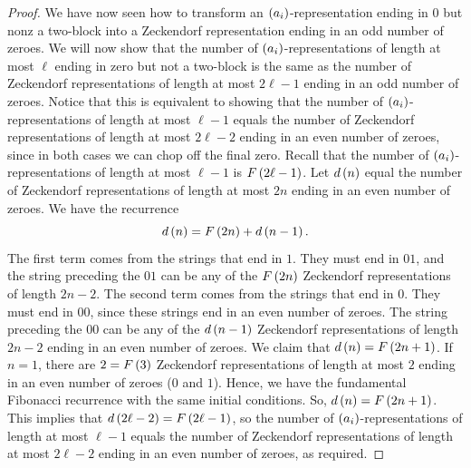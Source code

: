 \documentclass[english,12pt]{article}
\newcommand{\seq}{\p}
\begin{document}
\begin{proof}
We have now seen how to transform an $\seq{a_i}$-representation ending in $0$ but nonz a two-block into a Zeckendorf representation ending in an odd number of zeroes.  We will now show that the number of $\seq{a_i}$-representations of length at most $\ell$ ending in zero but not a two-block is the same as the number of Zeckendorf representations of length at most $2\ell-1$ ending in an odd number of zeroes.  Notice that this is equivalent to showing that the number of $\seq{a_i}$-representations of length at most $\ell-1$ equals the number of Zeckendorf representations of length at most $2\ell-2$  ending in an even number of zeroes, since in both cases we can chop off the final zero.  Recall that the number of $\seq{a_i}$-representations of length at most $\ell-1$ is $F\left(2\ell-1\right)$.  Let $d\left(n\right)$ equal the number of Zeckendorf representations of length at most $2n$ ending in an even number of zeroes.  We have the recurrence
\[
d\left(n\right)=F\left(2n\right)+d\left(n-1\right).
\]
The first term comes from the strings that end in $1$.  They must end in $01$, and the string preceding the $01$ can be any of the $F\left(2n\right)$ Zeckendorf representations of length $2n-2$.  The second term comes from the strings that end in $0$.  They must end in $00$, since these strings end in an even number of zeroes.  The string preceding the $00$ can be any of the $d\left(n-1\right)$ Zeckendorf representations of length $2n-2$ ending in an even number of zeroes.  We claim that $d\left(n\right)=F\left(2n+1\right)$.
If $n=1$, there are $2=F\left(3\right)$ Zeckendorf representations of length at most $2$  ending in an even number of zeroes ($0$ and $1$).  Hence, we have the fundamental Fibonacci recurrence with the same initial conditions.  So, $d\left(n\right)=F\left(2n+1\right)$.  
This implies that $d\left(2\ell-2\right)=F\left(2\ell-1\right)$, so the number of $\seq{a_i}$-representations of length at most $\ell-1$ equals the number of Zeckendorf representations of length at most $2\ell-2$  ending in an even number of zeroes, as required.
\end{proof}
\end{document}
